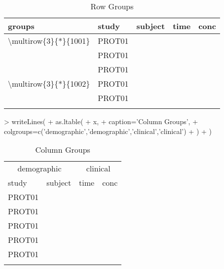 \documentclass[titlepage]{article}
\begin{document}
\begin{Schunk}
\begin{table}[H]
 \caption[Row Groups]{Row Groups }
 \begin{center}
  \begin{tabular}{l||lrrr}
    \hline \hline
   groups & study & subject & time & conc \\ \hline
   \textbackslash{}multirow\{3\}\{*\}\{1001\} & PROT01 & \verb#1001# & \verb#0# & \verb#0.12# \\
                          & PROT01 & \verb#1001# & \verb#1# & \verb#34.00# \\
                          & PROT01 & \verb#1001# & \verb#2# & \verb#5.60# \\
   \textbackslash{}multirow\{3\}\{*\}\{1002\} & PROT01 & \verb#1002# & \verb#0# & \verb#0.50# \\
                          & PROT01 & \verb#1002# & \verb#1# & \verb#200.00# \\
                          &  & \verb#1002# & \verb#2# & \verb## \\ \hline
  \end{tabular}
 \end{center}
\end{table}\end{Schunk}
\begin{Schunk}
\begin{Sinput}
> writeLines(
+   as.ltable(
+     x,
+     caption='Column Groups',
+     colgroups=c('demographic','demographic','clinical','clinical')
+   )
+ )
\end{Sinput}
\begin{table}[H]
 \caption[Column Groups]{Column Groups }
 \begin{center}
  \begin{tabular}{lrrr}
    \hline \hline
   \multicolumn{2}{c}{demographic} & \multicolumn{2}{c}{clinical} \\
   study & subject & time & conc \\ \hline
   PROT01 & \verb#1001# & \verb#0# & \verb#0.12# \\
   PROT01 & \verb#1001# & \verb#1# & \verb#34.00# \\
   PROT01 & \verb#1001# & \verb#2# & \verb#5.60# \\
   PROT01 & \verb#1002# & \verb#0# & \verb#0.50# \\
   PROT01 & \verb#1002# & \verb#1# & \verb#200.00# \\
    & \verb#1002# & \verb#2# & \verb## \\ \hline
  \end{tabular}
 \end{center}
\end{table}\end{Schunk}
\end{document}
